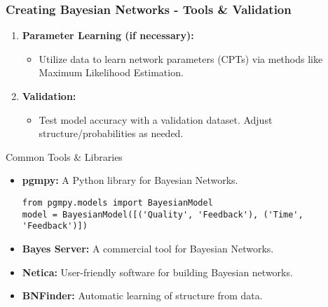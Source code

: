 \documentclass[aspectratio=169]{beamer}
\begin{document}
\begin{frame}[fragile]
    \frametitle{Creating Bayesian Networks - Tools & Validation}
    \begin{enumerate}[resume]
        \item \textbf{Parameter Learning (if necessary):}
            \begin{itemize}
                \item Utilize data to learn network parameters (CPTs) via methods like Maximum Likelihood Estimation.
            \end{itemize}
        \item \textbf{Validation:}
            \begin{itemize}
                \item Test model accuracy with a validation dataset. Adjust structure/probabilities as needed.
            \end{itemize}
    \end{enumerate}

    \begin{block}{Common Tools \& Libraries}
        \begin{itemize}
            \item \textbf{pgmpy:} A Python library for Bayesian Networks.
            \begin{lstlisting}
from pgmpy.models import BayesianModel
model = BayesianModel([('Quality', 'Feedback'), ('Time', 'Feedback')])
            \end{lstlisting}
            \item \textbf{Bayes Server:} A commercial tool for Bayesian Networks.
            \item \textbf{Netica:} User-friendly software for building Bayesian networks.
            \item \textbf{BNFinder:} Automatic learning of structure from data.
        \end{itemize}
    \end{block}
\end{frame}
\end{document}
